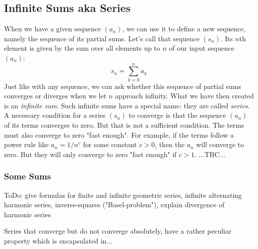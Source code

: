 

\subsection{Infinite Sums aka Series}
When we have a given sequence $(a_n)$, we can use it to define a new sequence, namely the sequence of its partial sums. Let's call that sequence $(s_n)$. Its $n$th element is given by the sum over all elements up to $n$ of our input sequence $(a_n)$:
\begin{equation}
 s_n = \sum_{k=0}^n a_k
\end{equation}
Just like with any sequence, we can ask whether this sequence of partial sums converges or diverges when we let $n$ approach infinity. What we have then created is an \emph{infinite sum}. Such infinite sums have a special name: they are called \emph{series}. A necessary condition for a series $(s_n)$ to converge is that the sequence $(a_n)$ of its terms converges to zero. But that is not a sufficient condition. The terms must also converge to zero "fast enough". For example, if the terms follow a power rule like $a_n = 1 / n^c$ for some constant $c > 0$, then the $a_n$ will converge to zero. But they will only converge to zero "fast enough" if $c > 1$.
...TBC...


\subsubsection{Some Sums}
ToDo: give formulas for finite and infinite geometric series, infinite alternating harmonic series, inverse-squares ("Basel-problem"), explain divergence of harmonic series


Series that converge but do not converge absolutely, have a rather peculiar property which is encapsulated in...






